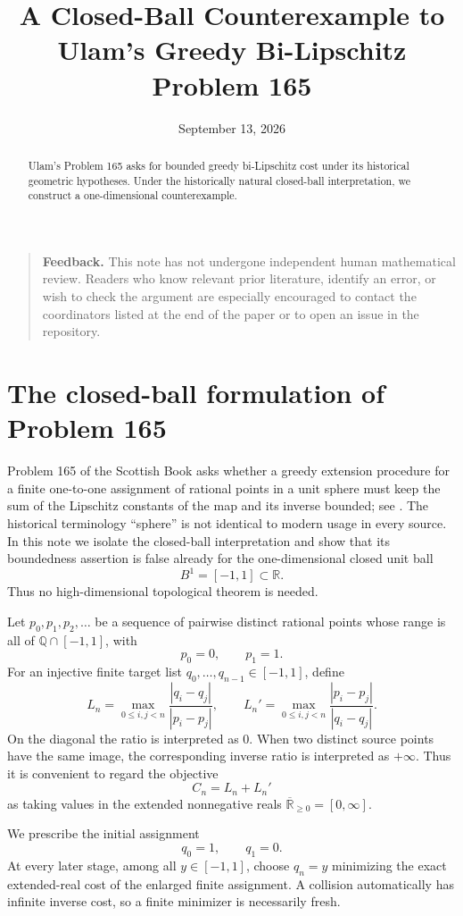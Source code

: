 \documentclass[11pt]{amsart}
\title[Ulam 165 on the closed unit interval]{A Closed-Ball Counterexample to Ulam's Greedy Bi-Lipschitz Problem 165}
\author{}
\date{September 13, 2026}
\theoremstyle{definition}
\theoremstyle{remark}
\newcommand{\R}{\mathbb R}
\newcommand{\Q}{\mathbb Q}
\newcommand{\Ball}{[-1,1]}
\newcommand{\eR}{\overline{\mathbb R}_{\ge 0}}
\begin{document}
\begin{abstract}
Ulam's Problem 165 asks for bounded greedy bi-Lipschitz cost under its historical geometric hypotheses. Under the historically natural closed-ball interpretation, we construct a one-dimensional counterexample.
\end{abstract}

\begin{quote}
\small
\textbf{Feedback.} This note has not undergone independent human mathematical review. Readers who know relevant prior literature, identify an error, or wish to check the argument are especially encouraged to contact the coordinators listed at the end of the paper or to open an issue in the repository.
\end{quote}


\section{The closed-ball formulation of Problem 165}

Problem 165 of the Scottish Book asks whether a greedy extension procedure for a finite one-to-one assignment of rational points in a unit sphere must keep the sum of the Lipschitz constants of the map and its inverse bounded; see \cite{Ulam1977,Mauldin2015}.  The historical terminology ``sphere'' is not identical to modern usage in every source.  In this note we isolate the closed-ball interpretation and show that its boundedness assertion is false already for the one-dimensional closed unit ball
\[
B^1=\Ball\subset\R.
\]
Thus no high-dimensional topological theorem is needed.

Let $p_0,p_1,p_2,\dots$ be a sequence of pairwise distinct rational points whose range is all of $\Q\cap[-1,1]$, with
\[
p_0=0,\qquad p_1=1.
\]
For an injective finite target list $q_0,\dots,q_{n-1}\in[-1,1]$, define
\[
 L_n=\max_{0\le i,j<n}\frac{|q_i-q_j|}{|p_i-p_j|},\qquad
 L_n'=\max_{0\le i,j<n}\frac{|p_i-p_j|}{|q_i-q_j|}.
\]
On the diagonal the ratio is interpreted as $0$.  When two distinct source points have the same image, the corresponding inverse ratio is interpreted as $+\infty$.  Thus it is convenient to regard the objective
\[
C_n=L_n+L_n'
\]
as taking values in the extended nonnegative reals $\eR=[0,\infty]$.

We prescribe the initial assignment
\[
q_0=1,\qquad q_1=0.
\]
At every later stage, among all $y\in[-1,1]$, choose $q_n=y$ minimizing the exact extended-real cost of the enlarged finite assignment.  A collision automatically has infinite inverse cost, so a finite minimizer is necessarily fresh.
\end{document}
